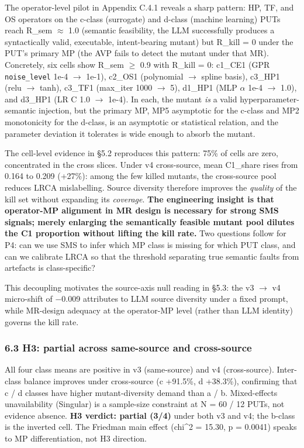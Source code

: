 \documentclass[review,12pt,authoryear]{elsarticle}
\begin{document}
The operator-level pilot in Appendix C.4.1 reveals a sharp pattern: HP,
TF, and OS operators on the c-class (surrogate) and d-class (machine
learning) PUTs reach R\_sem $\approx$ 1.0 (semantic feasibility, the LLM
successfully produces a syntactically valid, executable, intent-bearing
mutant) but R\_kill = 0 under the PUT's primary MP (the AVP fails to
detect the mutant under that MR). Concretely, six cells show R\_sem $\geq$
0.9 with R\_kill = 0: c1\_CE1 (GPR \texttt{noise\_level} 1e-4 $\to$ 1e-1),
c2\_OS1 (polynomial $\to$ spline basis), c3\_HP1 (relu $\to$ tanh), c3\_TF1
(max\_iter 1000 $\to$ 5), d1\_HP1 (MLP $\alpha$ 1e-4 $\to$ 1.0), and d3\_HP1 (LR C 1.0
$\to$ 1e-4). In each, the mutant \emph{is} a valid hyperparameter-semantic
injection, but the primary MP, MP5 asymptotic for the c-class and MP2
monotonicity for the d-class, is an asymptotic or statistical relation,
and the parameter deviation it tolerates is wide enough to absorb the
mutant.

The cell-level evidence in §5.2 reproduces this pattern: 75\% of cells
are zero, concentrated in the cross slices. Under v4 cross-source, mean
C1\_share rises from 0.164 to 0.209 (+27\%): among the few killed
mutants, the cross-source pool reduces LRCA mislabelling. Source
diversity therefore improves the \emph{quality} of the kill set without
expanding its \emph{coverage}. \textbf{The engineering insight is that
operator-MP alignment in MR design is necessary for strong SMS signals;
merely enlarging the semantically feasible mutant pool dilutes the C1
proportion without lifting the kill rate.} Two questions follow for P4:
can we use SMS to infer which MP class is missing for which PUT class,
and can we calibrate LRCA so that the threshold separating true semantic
faults from artefacts is class-specific?

This decoupling motivates the source-axis null reading in §5.3: the v3 $\to$
v4 micro-shift of −0.009 attributes to LLM source diversity under a
fixed prompt, while MR-design adequacy at the operator-MP level (rather
than LLM identity) governs the kill rate.

\subsubsection{6.3 H3: partial across same-source and cross-source}\label{h4-partial-across-same-source-and-cross-source}

All four class means are positive in v3 (same-source) and v4
(cross-source). Inter-class balance improves under cross-source (c
+91.5\%, d +38.3\%), confirming that c / d classes have higher
mutant-diversity demand than a / b. Mixed-effects unavailability
(Singular) is a sample-size constraint at N = 60 / 12 PUTs, not evidence
absence. \textbf{H3 verdict: partial (3/4)} under both v3 and v4; the
b-class is the inverted cell. The Friedman main effect (chi\^{}2 =
15.30, p = 0.0041) speaks to MP differentiation, not H3 direction.
\end{document}

